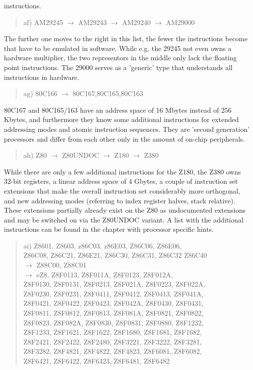 \documentclass[12pt,twoside]{report}
\begin{document}
instructions.
\begin{quote}
af) AM29245 $\rightarrow$ AM29243 $\rightarrow$ AM29240 $\rightarrow$ AM29000
\end{quote}
The further one moves to the right in this list, the fewer the
instructions become that have to be emulated in software.  While e.g.
the 29245 not even owns a hardware multiplier, the two representors in
the middle only lack the floating point instructions.  The 29000
serves as a 'generic' type that understands all instructions in
hardware.
\begin{quote}
ag) 80C166 $\rightarrow$ 80C167,80C165,80C163
\end{quote}
80C167 and 80C165/163 have an address space of 16 Mbytes instead of 256
Kbytes, and furthermore they know some additional instructions for
extended addressing modes and atomic instruction sequences.  They are
'second generation' processors and differ from each other only in the
amount of on-chip peripherals.
\begin{quote}
ah) Z80 $\rightarrow$ Z80UNDOC $\rightarrow$ Z180 $\rightarrow$ Z380
\end{quote}
While there are only a few additional instructions for the Z180, the
Z380 owns 32-bit registers, a linear address space of 4 Gbytes, a
couple of instruction set extensions that make the overall
instruction set considerably more orthogonal, and new addressing
modes (referring to index register halves, stack relative).  These
extensions partially already exist on the Z80 as undocumented
extensions and may be switched on via the Z80UNDOC variant.  A list
with the additional instructions can be found in the chapter
with processor specific hints.
\begin{quote}
ai) Z8601, Z8603, z86C03, z86E03, Z86C06, Z86E06, \\
    Z86C08, Z86C21, Z86E21, Z86C30, Z86C31, Z86C32 Z86C40 \\
    $\rightarrow$ Z88C00, Z88C01 \\
    $\rightarrow$ eZ8, Z8F0113, Z8F011A, Z8F0123, Z8F012A, \\
    Z8F0130, Z8F0131, Z8F0213, Z8F021A, Z8F0223, Z8F022A, \\
    Z8F0230, Z8F0231, Z8F0411, Z8F0412, Z8F0413, Z8F041A, \\
    Z8F0421, Z8F0422, Z8F0423, Z8F042A, Z8F0430, Z8F0431, \\
    Z8F0811, Z8F0812, Z8F0813, Z8F081A, Z8F0821, Z8F0822, \\
    Z8F0823, Z8F082A, Z8F0830, Z8F0831, Z8F0880, Z8F1232, \\
    Z8F1233, Z8F1621, Z8F1622, Z8F1680, Z8F1681, Z8F1682, \\
    Z8F2421, Z8F2422, Z8F2480, Z8F3221, Z8F3222, Z8F3281, \\
    Z8F3282, Z8F4821, Z8F4822, Z8F4823, Z8F6081, Z8F6082, \\
    Z8F6421, Z8F6422, Z8F6423, Z8F6481, Z8F6482
\end{quote}
\end{document}
